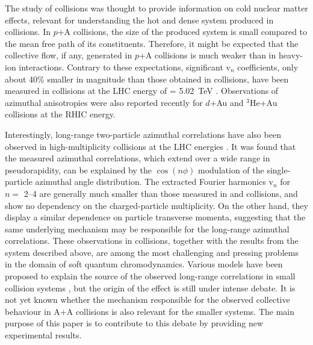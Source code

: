 \documentclass[cernpreprint,texlive=2014,txfonts,UKenglish]{latex/atlasdoc}
\begin{document}
The study of \pNuc collisions was thought to provide information on cold nuclear matter effects, relevant for understanding the hot and dense system produced in \NucNuc collisions. In $p$+A collisions, the size of the produced system is small compared to the mean free path of its constituents. Therefore, it might be expected that the collective flow, if any, generated in $p$+A collisions is much weaker than in heavy-ion interactions. Contrary to these expectations, significant $\mathrm{v}_n$ coefficients, only about 40\% smaller in magnitude than those obtained in \PbPb collisions, have been measured in \pPb collisions at the LHC energy of \sqn = 5.02~TeV \cite{pPbcms1,pPbalice1,pPbatlas1,pPbatlas2,pPbcms2,pPbalice2,pPbatlas3,pPbcms3,pPbLHCb1,pPbcms4}. Observations of azimuthal anisotropies were also reported recently for $d$+Au \cite{rhicdAu1,rhicdAu2} and $^{3}$He+Au \cite{rhicHeAu} collisions at the RHIC energy. 

Interestingly, long-range two-particle azimuthal correlations have also been observed in high-multiplicity \pp collisions at the LHC energies \cite{ppcms1,ppatlas1,ppcms2,ppcms3,ppatlas2}. It was found that the measured azimuthal correlations, which extend over a wide range in pseudorapidity, can be explained by the $\cos (n\phi)$ modulation of the single-particle azimuthal angle distribution. The extracted Fourier harmonics $\mathrm{v}_n$ for $n=$ 2--4 \cite{ppatlas2} are generally much smaller than those measured in \pPb and \PbPb collisions, and show no dependency on the charged-particle multiplicity. On the other hand, they display a similar dependence on particle transverse momenta, suggesting that the same underlying mechanism may be responsible for the long-range azimuthal correlations. These observations in \pp collisions, together with the results from the \pNuc  system described above, are among the most challenging and pressing problems in the domain of soft quantum chromodynamics.  Various models have been proposed to explain the source of the observed long-range correlations in small collision systems \cite{werner,ryskin,wong,avsar,deng,bozek,strikman,bozek1,dusling1,kovchegov,dusling,BzdakSchenke,v468Ollitrault,MaBzdak,schenke1,chesler1,chesler2}, but the origin of the effect is still under intense debate.  It is not yet known whether the mechanism responsible for the observed collective behaviour in A+A collisions is also relevant for the smaller systems. The main purpose of this paper is to contribute to this debate by providing new experimental results. 
\end{document}
